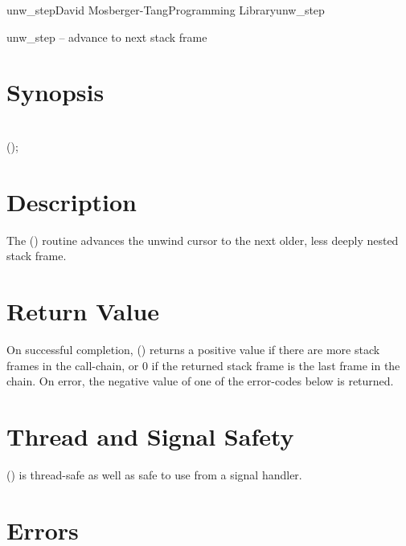 \documentclass{article}
\begin{document}
\begin{Name}{3}{unw\_step}{David Mosberger-Tang}{Programming Library}{unw\_step}

  unw\_step -- advance to next stack frame
\end{Name}

\section{Synopsis}

\\

 ();\\

\section{Description}

The () routine advances the unwind cursor  to
the next older, less deeply nested stack frame.

\section{Return Value}

On successful completion, () returns a positive value
if there are more stack frames in the call-chain, or 0 if the returned
stack frame is the last frame in the chain.  On error, the negative
value of one of the error-codes below is returned.

\section{Thread and Signal Safety}

() is thread-safe as well as safe to use
from a signal handler.

\section{Errors}
\end{document}
